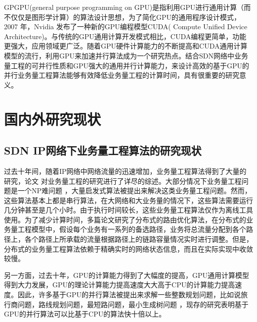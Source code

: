 \documentclass[master]{thesis-uestc}
\begin{document}
GPGPU(general purpose programming on GPU)是指利用GPU进行通用计算（而不仅仅是图形学计算）的算法设计思想，为了简化GPU的通用程序设计模式，2007 年，Nvidia 发布了一种新的GPU编程模型CUDA( Compute Unified Device Architecture)。与传统的GPU通用计算开发模式相比，CUDA编程更简单，功能更强大，应用领域更广泛。随着GPU硬件计算能力的不断提高和CUDA通用计算模型的流行，利用GPU来加速并行算法成为一个研究热点。结合SDN网络中业务量工程的可并行性质和GPU强大的通用并行计算能力，来设计高效的基于GPU的并行业务量工程算法能够有效降低业务量工程的计算时间，具有很重要的研究意义。



\section{国内外研究现状}
\subsection{SDN IP网络下业务量工程算法的研究现状}
过去十年间，随着IP网络中网络流量的迅速增加，业务量工程算法得到了大量的研究，论文 对业务量工程的研究进行了详尽的综述。大部分情况下业务量工程问题是一个NP难问题 ，大量启发式算法被提出来解决这类业务量工程问题。然而，这些算法基本上都是串行算法，在大网络和大业务量的情况下，这些算法需要运行几分钟甚至是几个小时。由于执行时间较长，这些业务量工程算法仅作为离线工具使用。为了减少计算时间，多篇论文研究了分布式的路由优化算法，在分布式的业务量工程模型中，假设每个业务有一系列的备选路径，业务将总流量分配到各个路径上，各个路径上所承载的流量根据路径上的链路容量情况实时进行调整。但是，分布式的业务量工程算法依赖于精确实时的网络状态信息，而且在实际实现中收敛较慢。

另一方面，过去十年，GPU的计算能力得到了大幅度的提高，GPU通用计算模型得到大力发展，GPU的理论计算能力提高速度大大高于CPU的计算能力提高速度。因此，许多基于GPU的并行算法被提出来求解一些整数规划问题，比如说旅行商问题，路线规划问题，最短路问题，最小生成树问题 ，现存的研究表明基于GPU的并行算法可以比基于CPU的算法快十倍以上。
\end{document}
